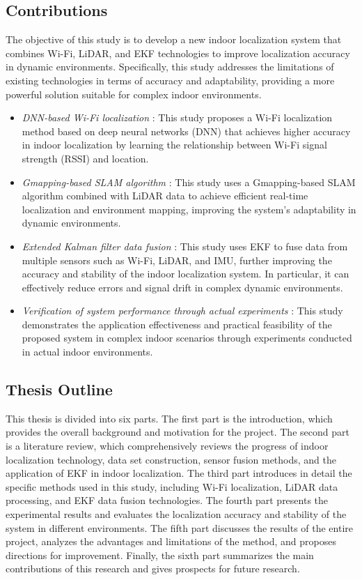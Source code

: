 \documentclass[12pt,a4paper]{article}
\numberwithin{equation}{section}
\begin{document}
\subsection{Contributions}
The objective of this study is to develop a new indoor localization system that
combines Wi-Fi, LiDAR, and EKF technologies to improve localization accuracy in
dynamic environments. Specifically, this study addresses the limitations of
existing technologies in terms of accuracy and adaptability, providing a more
powerful solution suitable for complex indoor environments.
\begin{itemize}
\item \textit{DNN-based Wi-Fi localization} : This study proposes a Wi-Fi
  localization method based on deep neural networks (DNN) that achieves higher
  accuracy in indoor localization by learning the relationship between Wi-Fi
  signal strength (RSSI) and location.
    
\item \textit{Gmapping-based SLAM algorithm} : This study uses a Gmapping-based
  SLAM algorithm combined with LiDAR data to achieve efficient real-time
  localization and environment mapping, improving the system's adaptability in
  dynamic environments.
    
\item \textit{Extended Kalman filter data fusion} : This study uses EKF to fuse
  data from multiple sensors such as Wi-Fi, LiDAR, and IMU, further improving
  the accuracy and stability of the indoor localization system. In particular,
  it can effectively reduce errors and signal drift in complex dynamic
  environments.
    
\item \textit{Verification of system performance through actual experiments} :
  This study demonstrates the application effectiveness and practical
  feasibility of the proposed system in complex indoor scenarios through
  experiments conducted in actual indoor environments.
\end{itemize}

\subsection{Thesis Outline}
This thesis is divided into six parts. The first part is the introduction, which
provides the overall background and motivation for the project. The second part
is a literature review, which comprehensively reviews the progress of indoor
localization technology, data set construction, sensor fusion methods, and the
application of EKF in indoor localization. The third part introduces in detail
the specific methods used in this study, including Wi-Fi localization, LiDAR
data processing, and EKF data fusion technologies. The fourth part presents the
experimental results and evaluates the localization accuracy and stability of
the system in different environments. The fifth part discusses the results of
the entire project, analyzes the advantages and limitations of the method, and
proposes directions for improvement. Finally, the sixth part summarizes the main
contributions of this research and gives prospects for future research.
\end{document}
